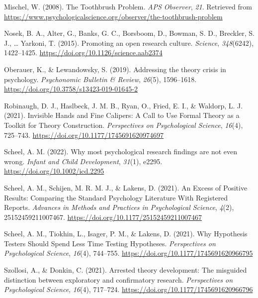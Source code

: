 \documentclass[
  man]{apa6}
\newlength{\cslhangindent}
\newenvironment{CSLReferences}[2] %
 {\begin{list}{}{%
  \setlength{\itemindent}{0pt}
  \setlength{\leftmargin}{0pt}
  \setlength{\parsep}{0pt}
  \ifodd #1
   \setlength{\leftmargin}{\cslhangindent}
   \setlength{\itemindent}{-1\cslhangindent}
  \fi
  \setlength{\itemsep}{#2\baselineskip}}}
 {\end{list}}
\begin{document}
\begin{CSLReferences}{1}{0}
Mischel, W. (2008). The {Toothbrush Problem}. \emph{APS Observer}, \emph{21}. Retrieved from \url{https://www.psychologicalscience.org/observer/the-toothbrush-problem}

Nosek, B. A., Alter, G., Banks, G. C., Borsboom, D., Bowman, S. D., Breckler, S. J., \ldots{} Yarkoni, T. (2015). Promoting an open research culture. \emph{Science}, \emph{348}(6242), 1422--1425. \url{https://doi.org/10.1126/science.aab2374}

Oberauer, K., \& Lewandowsky, S. (2019). Addressing the theory crisis in psychology. \emph{Psychonomic Bulletin \& Review}, \emph{26}(5), 1596--1618. \url{https://doi.org/10.3758/s13423-019-01645-2}

Robinaugh, D. J., Haslbeck, J. M. B., Ryan, O., Fried, E. I., \& Waldorp, L. J. (2021). Invisible {Hands} and {Fine Calipers}: {A Call} to {Use Formal Theory} as a {Toolkit} for {Theory Construction}. \emph{Perspectives on Psychological Science}, \emph{16}(4), 725--743. \url{https://doi.org/10.1177/1745691620974697}

Scheel, A. M. (2022). Why most psychological research findings are not even wrong. \emph{Infant and Child Development}, \emph{31}(1), e2295. \url{https://doi.org/10.1002/icd.2295}

Scheel, A. M., Schijen, M. R. M. J., \& Lakens, D. (2021). An {Excess} of {Positive Results}: {Comparing} the {Standard Psychology Literature With Registered Reports}. \emph{Advances in Methods and Practices in Psychological Science}, \emph{4}(2), 25152459211007467. \url{https://doi.org/10.1177/25152459211007467}

Scheel, A. M., Tiokhin, L., Isager, P. M., \& Lakens, D. (2021). Why {Hypothesis Testers Should Spend Less Time Testing Hypotheses}. \emph{Perspectives on Psychological Science}, \emph{16}(4), 744--755. \url{https://doi.org/10.1177/1745691620966795}

Szollosi, A., \& Donkin, C. (2021). Arrested theory development: {The} misguided distinction between exploratory and confirmatory research. \emph{Perspectives on Psychological Science}, \emph{16}(4), 717--724. \url{https://doi.org/10.1177/1745691620966796}

\end{CSLReferences}
\end{document}
